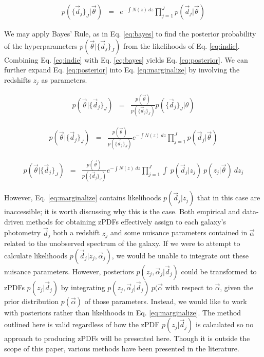 \documentclass[preprint]{aastex}
\begin{document}
\begin{eqnarray}
\label{eq:indie}
p(\{\vec{d}_{j}\}_{J}|\vec{\theta}) &=& e^{-\int N(z)\ dz}\prod_{j=1}^{J}p(\vec{d}_{j}|\vec{\theta})
\end{eqnarray}

We may apply Bayes' Rule, as in Eq. \ref{eq:bayes} to find the posterior probability of the hyperparameters $p(\vec{\theta}|\{\vec{d}_{j}\}_{J})$ from the likelihoods of Eq. \ref{eq:indie}.  Combining Eq. \ref{eq:indie} with Eq. \ref{eq:bayes} yields Eq. \ref{eq:posterior}.  We can further expand Eq. \ref{eq:posterior} into Eq. \ref{eq:marginalize} by involving the redshifts $z_{j}$ as parameters.

\begin{eqnarray}
\label{eq:bayes}
p(\vec{\theta}|\{\vec{d}_{j}\}_{J}) &=& \frac{p(\vec{\theta})}{p(\{\vec{d}_{j}\}_{J})}p(\{\vec{d}_{j}\}_{J}|\theta)
\end{eqnarray}

\begin{eqnarray}
\label{eq:posterior}
p(\vec{\theta}|\{\vec{d}_{j}\}_{J}) &=& \frac{p(\vec{\theta})}{p(\{\vec{d}_{j}\}_{J})}e^{-\int N(z)\ dz}\prod_{j=1}^{J}p(\vec{d}_{j}|\vec{\theta})
\end{eqnarray}

\begin{eqnarray}
\label{eq:marginalize}
p(\vec{\theta}|\{\vec{d}_{j}\}_{J}) &=& \frac{p(\vec{\theta})}{p(\{\vec{d}_{j}\}_{J})}e^{-\int N(z)\ dz}\prod_{j=1}^{J}\int\ p(\vec{d}_{j}|z_{j})\ p(z_{j}|\vec{\theta})\ dz_{j}
\end{eqnarray}

However, Eq. \ref{eq:marginalize} contains likelihoods $p(\vec{d}_{j}|z_{j})$ that in this case are inaccessible; it is worth discussing why this is the case.  Both empirical and data-driven methods for obtaining zPDFs effectively assign to each galaxy's photometry $\vec{d}_{j}$ both a redshift $z_{j}$ and some nuisance parameters contained in $\vec{\alpha}$ related to the unobserved spectrum of the galaxy.  If we were to attempt to calculate likelihoods $p(\vec{d}_{j}|z_{j},\vec{\alpha}_{j})$, we would be unable to integrate out these nuisance parameters.  However, posteriors $p(z_{j},\vec{\alpha}_{j}|\vec{d}_{j})$ could be transformed to zPDFs $p(z_{j}|\vec{d}_{j})$ by integrating $p(z_{j},\vec{\alpha}_{j}|\vec{d}_{j})\ p(\vec{\alpha}$ with respect to $\vec{\alpha}$, given the prior distribution $p(\vec{\alpha})$ of those parameters.  Instead, we would like to work with posteriors rather than likelihoods in Eq. \ref{eq:marginalize}.  The method outlined here is valid regardless of how the zPDF $p(z_{j}|\vec{d}_{j})$ is calculated so no approach to producing zPDFs will be presented here.  Though it is outside the scope of this paper, various methods have been presented in the literature. \citep{she11, bal08, car13, car14}
\end{document}
